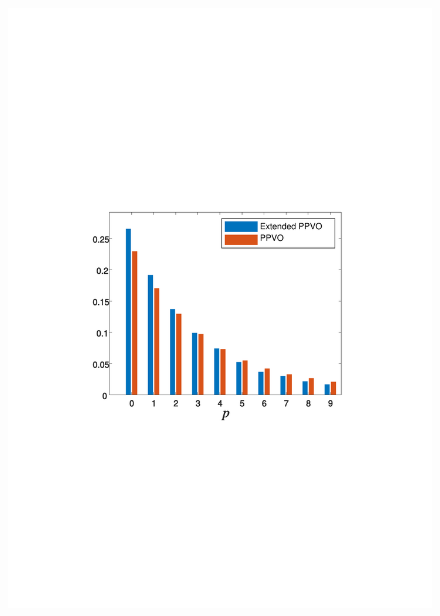 \documentclass[review,3p,10pt,sort&compress]{elsarticle}
\begin{document}
\begin{figure}
{\begin{minipage}[t]{0.225\linewidth}
    \includegraphics[width=1\textwidth]{figures/Comparison/boat.pdf}
    \end{minipage}
}
\end{figure}
\end{document}
